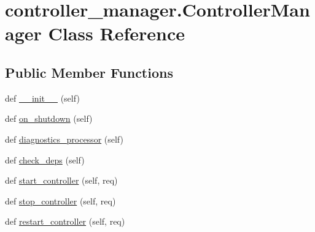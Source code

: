 \hypertarget{classcontroller__manager_1_1_controller_manager}{}\section{controller\+\_\+manager.\+Controller\+Manager Class Reference}
\label{classcontroller__manager_1_1_controller_manager}
\subsection*{Public Member Functions}
\begin{DoxyCompactItemize}
\item 
def \hyperlink{classcontroller__manager_1_1_controller_manager_a92e6e1983e89e13d96ead32a5d311655}{\+\_\+\+\_\+init\+\_\+\+\_\+} (self)
\item 
def \hyperlink{classcontroller__manager_1_1_controller_manager_a0d85576b1fbfd7e7e8361ce3d4518920}{on\+\_\+shutdown} (self)
\item 
def \hyperlink{classcontroller__manager_1_1_controller_manager_aa87554fb74a01e962e39ee1b33fecc83}{diagnostics\+\_\+processor} (self)
\item 
def \hyperlink{classcontroller__manager_1_1_controller_manager_a3d03ada2320233f373b3af8bdff63b0d}{check\+\_\+deps} (self)
\item 
def \hyperlink{classcontroller__manager_1_1_controller_manager_a4d92280a301d78500055ebccdaf14820}{start\+\_\+controller} (self, req)
\item 
def \hyperlink{classcontroller__manager_1_1_controller_manager_a54e01b56f67af0b1434c53b1c0abe7ef}{stop\+\_\+controller} (self, req)
\item 
def \hyperlink{classcontroller__manager_1_1_controller_manager_a732d60e383dbfd284d1f441e8f065b1b}{restart\+\_\+controller} (self, req)
\end{DoxyCompactItemize}
